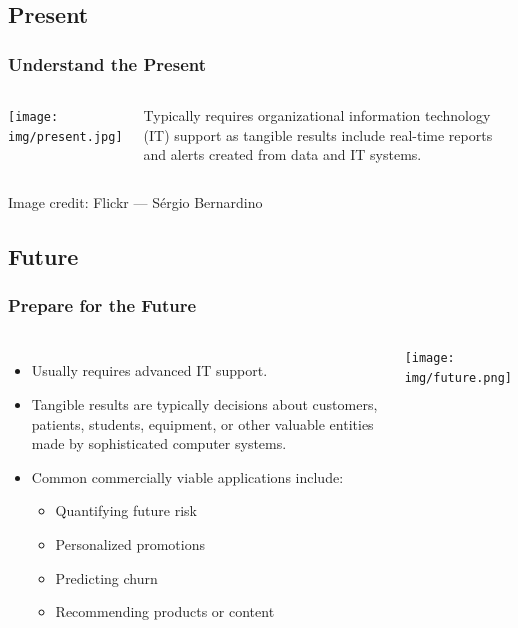 \documentclass[11pt,
               aspectratio=169
               ]{beamer}
\begin{document}
	\subsection{Present}

		\begin{frame}
		
			\frametitle{Understand the Present}
		
			\begin{columns}
			
				\centering
				\texttt{[image: img/present.jpg]}
			
					Typically requires organizational information technology (IT) support as tangible results include real-time reports and alerts created from data and IT systems.  
			\end{columns}
		
			\vspace{10pt}
		
			\tiny Image credit: Flickr --- Sérgio Bernardino
		
		\end{frame}	
		
	\subsection{Future}

		\begin{frame}
		
			\frametitle{Prepare for the Future}
			
			\begin{columns}
					
				\column{0.58\linewidth}
				\begin{itemize}
				\item Usually requires advanced IT support.
				\item Tangible results are typically decisions about customers, patients, students, equipment, or other valuable entities made by sophisticated computer systems.
				\item Common commercially viable applications include:
					\begin{itemize}
						\item Quantifying future risk
						\item Personalized promotions
						\item Predicting churn 
						\item Recommending products or content
					\end{itemize}
				\end{itemize}
				\column{0.4\linewidth}
				\centering
				\texttt{[image: img/future.png]}
				
			\end{columns}
		
		\end{frame}		
				
\end{document}
